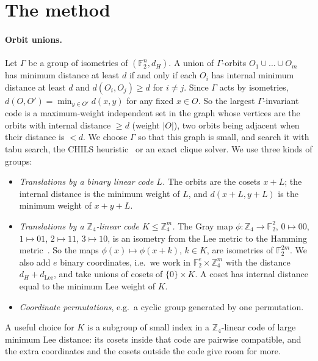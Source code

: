 \documentclass[11pt]{article}
\newcommand{\F}{\mathbb{F}_2}
\newcommand{\Z}{\mathbb{Z}_4}
\begin{document}
\section{The method}

\paragraph{Orbit unions.} Let $\Gamma$ be a group of isometries of $(\F^n,d_H)$. A union of $\Gamma$-orbits
$O_1\cup\dots\cup O_m$ has minimum distance at least $d$ if and only if each $O_i$ has internal minimum distance at
least $d$ and $d(O_i,O_j)\ge d$ for $i\ne j$. Since $\Gamma$ acts by isometries, $d(O,O')=\min_{y\in O'}d(x,y)$ for
any fixed $x\in O$. So the largest $\Gamma$-invariant code is a maximum-weight independent set in the graph whose
vertices are the orbits with internal distance $\ge d$ (weight $|O|$), two orbits being adjacent when their distance is
$<d$. We choose $\Gamma$ so that this graph is small, and search it with tabu search, the CHILS heuristic~\cite{CHILS}
or an exact clique solver. We use three kinds of groups:
\begin{itemize}
\item \emph{Translations by a binary linear code $L$.} The orbits are the cosets $x+L$; the internal distance is the
minimum weight of $L$, and $d(x+L,y+L)$ is the minimum weight of $x+y+L$.
\item \emph{Translations by a $\Z$-linear code $K\le\Z^m$.} The Gray map $\phi:\Z\to\F^2$, $0\mapsto00$, $1\mapsto01$,
$2\mapsto11$, $3\mapsto10$, is an isometry from the Lee metric to the Hamming metric~\cite{HKCSS}. So the maps
$\phi(x)\mapsto\phi(x+k)$, $k\in K$, are isometries of $\F^{2m}$. We also add $e$ binary coordinates, i.e.\ we work in
$\F^e\times\Z^m$ with the distance $d_H+d_{\mathrm{Lee}}$, and take unions of cosets of $\{0\}\times K$. A coset has
internal distance equal to the minimum Lee weight of $K$.
\item \emph{Coordinate permutations}, e.g.\ a cyclic group generated by one permutation.
\end{itemize}
A useful choice for $K$ is a subgroup of small index in a $\Z$-linear code of large minimum Lee distance: its cosets
inside that code are pairwise compatible, and the extra coordinates and the cosets outside the code give room for more.
\end{document}
